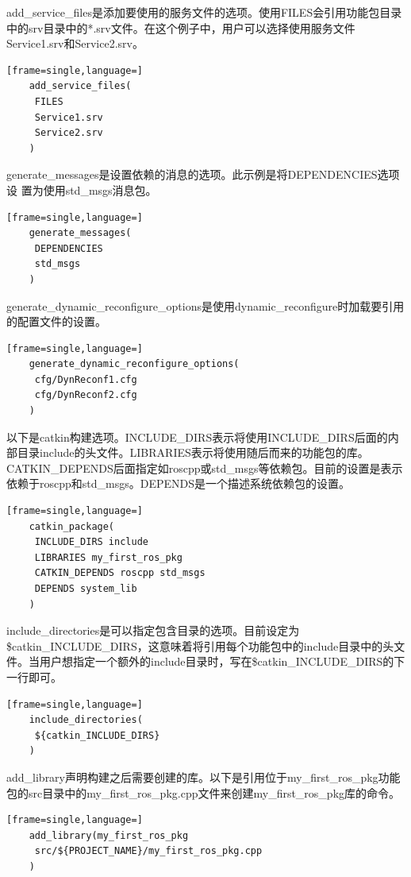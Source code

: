 \documentclass[geye,green,kindle,cn]{elegantnote}
\begin{document}
add\_service\_files是添加要使用的服务文件的选项。使用FILES会引用功能包目录中的srv目录中的*.srv文件。在这个例子中，用户可以选择使用服务文件Service1.srv和Service2.srv。
\begin{lstlisting}[frame=single,language=]
    add_service_files(
     FILES
     Service1.srv
     Service2.srv
    ) 
\end{lstlisting}

generate\_messages是设置依赖的消息的选项。此示例是将DEPENDENCIES选项设 置为使用std\_msgs消息包。 
\begin{lstlisting}[frame=single,language=]
    generate_messages(
     DEPENDENCIES  
     std_msgs 
    ) 
\end{lstlisting}

generate\_dynamic\_reconfigure\_options是使用dynamic\_reconfigure时加载要引用的配置文件的设置。
\begin{lstlisting}[frame=single,language=]
    generate_dynamic_reconfigure_options(
     cfg/DynReconf1.cfg
     cfg/DynReconf2.cfg
    ) 
\end{lstlisting}

以下是catkin构建选项。INCLUDE\_DIRS表示将使用INCLUDE\_DIRS后面的内部目录include的头文件。LIBRARIES表示将使用随后而来的功能包的库。CATKIN\_DEPENDS后面指定如roscpp或std\_msgs等依赖包。目前的设置是表示依赖于roscpp和std\_msgs。DEPENDS是一个描述系统依赖包的设置。
\begin{lstlisting}[frame=single,language=]
    catkin_package(
     INCLUDE_DIRS include
     LIBRARIES my_first_ros_pkg
     CATKIN_DEPENDS roscpp std_msgs
     DEPENDS system_lib
    )
\end{lstlisting}

include\_directories是可以指定包含目录的选项。目前设定为\${catkin\_INCLUDE\_DIRS}，这意味着将引用每个功能包中的include目录中的头文件。当用户想指定一个额外的include目录时，写在\${catkin\_INCLUDE\_DIRS}的下一行即可。 
\begin{lstlisting}[frame=single,language=]
    include_directories(
     ${catkin_INCLUDE_DIRS}
    ) 
\end{lstlisting}

add\_library声明构建之后需要创建的库。以下是引用位于my\_first\_ros\_pkg功能包的src目录中的my\_first\_ros\_pkg.cpp文件来创建my\_first\_ros\_pkg库的命令。
\begin{lstlisting}[frame=single,language=]
    add_library(my_first_ros_pkg
     src/${PROJECT_NAME}/my_first_ros_pkg.cpp
    ) 
\end{lstlisting}
\end{document}
